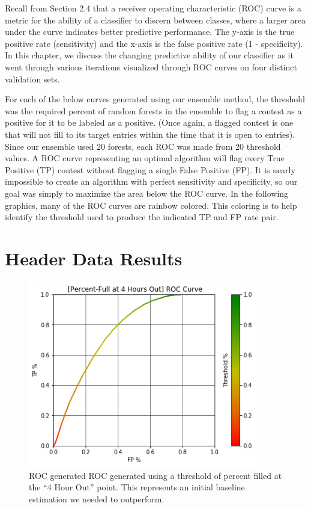 Recall from Section 2.4 that a receiver operating characteristic (ROC) curve is a metric for the ability of a classifier to discern between classes, where a larger area under the curve indicates better predictive performance. The y-axis is the true positive rate (sensitivity) and the x-axis is the false positive rate (1 - specificity). In this chapter, we discuss the changing predictive ability of our classifier as it went through various iterations visualized through ROC curves on four distinct validation sets.

For each of the below curves generated using our ensemble method, the threshold was the required percent of random forests in the ensemble to flag a contest as a positive for it to be labeled as a positive. (Once again, a flagged contest is one that will not fill to its target entries within the time that it is open to entries). Since our ensemble used 20 forests, each ROC was made from 20 threshold values. A ROC curve representing an optimal algorithm will flag every True Positive (TP) contest without flagging a single False Positive (FP). It is nearly impossible to create an algorithm with perfect sensitivity and specificity, so our goal was simply to maximize the area below the ROC curve. 
In the following graphics, many of the ROC curves are rainbow colored. This coloring is to help identify the threshold used to produce the indicated TP and FP rate pair.

\pagebreak

\section{Header Data Results}

\begin{figure}[h]
\centering
\includegraphics[width=10cm]{body/results/Graphs/JustMeta/1.Baseline/index.png}
\caption{ROC generated ROC generated using a threshold of percent filled at the ``4 Hour Out'' point. This represents an initial baseline estimation we needed to outperform.}
\label{fig:baseline}
\end{figure}

